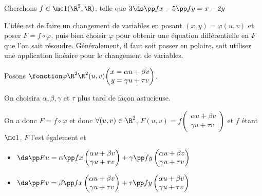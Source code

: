 \begin{exemple}
    Cherchons $f \in \mc 1 (\R^2, \R)$, telle que $3 \ds \pp f x - 5 \pp f y = x - 2 y$

    L'idée est de faire un changement de variables en posant $(x, y) = \varphi(u, v)$
    et poser $F = f \circ \varphi$, puis bien choisir $\varphi$ pour obtenir une 
    équation différentielle en $F$ que l'on sait résoudre. Généralement, il faut soit 
    passer en polaire, soit utiliser une application linéaire pour le changement de variables.

    \avspace Posons $\fonction \varphi {\R^2}{\R^2}{(u, v)}{\begin{pmatrix}
        x = \alpha u + \beta v \\
        y = \gamma u + \tau v 
    \end{pmatrix}}$.

    On choisira $\alpha, \beta, \gamma$ et $\tau$ plus tard de façon astucieuse.
    
    On a donc $F = f \circ \varphi $ et donc 
    $\forall (u, v) \in \R^2$, $F(u, v) = f \begin{pmatrix}
        \alpha u + \beta v \\
        \gamma u + \tau v
    \end{pmatrix}$
    et $f$ étant $\mc 1$, $F$ l'est également et 

    \svspace \begin{itemize}
        \item $\ds \pp F u = \alpha \pp f x \begin{pmatrix}
            \alpha u + \beta v \\
            \gamma u + \tau v
        \end{pmatrix} + \gamma \pp f y \begin{pmatrix}
            \alpha u + \beta v \\
            \gamma u + \tau v
        \end{pmatrix}$
        \item $\ds \pp F v = \beta \pp f x \begin{pmatrix}
            \alpha u + \beta v \\
            \gamma u + \tau v
        \end{pmatrix} + \tau \pp f y \begin{pmatrix}
            \alpha u + \beta v \\
            \gamma u + \tau v
        \end{pmatrix}$
    \end{itemize}


\end{exemple}
